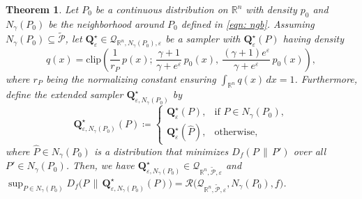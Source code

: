 \documentclass[accepted]{article}
\theoremstyle{plain} %
\newtheorem{theorem}{Theorem}[section]
\theoremstyle{definition}
\theoremstyle{remark}
\newcommand{\bQ}{\mathbf{Q}}
\newcommand{\ngb}{N_\gamma(P_0)}
\begin{document}
\begin{theorem}\label{thm: local pure}
Let \( P_0 \) be a continuous distribution on \( \mathbb{R}^n \) with density \( p_0\) and $N_\gamma(P_0)$ be the neighborhood around $P_0$ defined in \eqref{eqn: ngb}. Assuming \( N_\gamma(P_0) \subseteq \tilde{\mathcal{P}} \), let 
\( \bQ^\star_\varepsilon \in \mathcal{Q}_{\mathbb{R}^n, N_\gamma(P_0), \varepsilon} \) be  a sampler with \( \bQ^\star_\varepsilon(P) \)  having density
\[
q(x) 
= \mathrm{clip}\left(
\frac{1}{r_P} \, p(x); \,
\frac{\gamma + 1}{\gamma + e^\varepsilon} \, p_0(x),\ 
\frac{(\gamma + 1)e^\varepsilon}{\gamma + e^\varepsilon} \, p_0(x)
\right),
\]
where \( r_P \) being the normalizing constant ensuring \( \int_{\mathbb{R}^n} q(x) \, dx = 1 \).
Furthermore, define the extended sampler 
\( \bQ^\star_{\varepsilon, N_\gamma(P_0)} \) by
\[
\bQ^\star_{\varepsilon, N_\gamma(P_0)}(P) \coloneqq
\begin{cases}
\bQ^\star_\varepsilon(P), & \text{if } P \in N_\gamma(P_0), \\[1pt]
\bQ^\star_\varepsilon(\hat{P}), & \text{otherwise},
\end{cases}
\]
where \( \hat{P} \in N_\gamma(P_0) \) is a distribution that minimizes \(  D_f(P \,\|\, P') \) over all $P' \in N_\gamma(P_0)$.
Then, we have \( \bQ^\star_{\varepsilon, N_\gamma(P_0)} \in \mathcal{Q}_{\mathbb{R}^n, \tilde{\mathcal{P}}, \varepsilon} \) and 
$
\sup_{P \in N_\gamma(P_0)} D_f\big(P \,\|\, \bQ^\star_{\varepsilon, N_\gamma(P_0)}(P)\big)
= \mathcal{R}\big(\mathcal{Q}_{\mathbb{R}^n, \tilde{\mathcal{P}}, \varepsilon}, N_\gamma(P_0), f\big)$.
\end{theorem}


\end{document}

